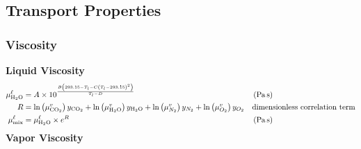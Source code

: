         \newpage
        \subsection{Transport Properties}
            \subsubsection{Viscosity} \cite{Morgan2015}
                \textbf{Liquid Viscosity}
                \begin{align}
                    \mu ^{\liq}_{\HtwoO} &= A \times 10^\frac{B\left(293.15 - T_l - C\left(T_l - 293.15\right)^2\right)}{T_l - D}
                    && \left(\unit{Pa\,s}\right)\\
                    R &= \ln\left(\mu^{\vap}_{\COtwo}\right) y_{\COtwo}+\ln\left(\mu^{\vap}_{\HtwoO}\right) y_{\HtwoO}+\ln\left(\mu^{\vap}_{N_2}\right) y_{N_2}+\ln\left(\mu^{\vap}_{O_2}\right) y_{O_2}
                    && \text{dimensionless correlation term}\\
                    \mu ^{\liq}_{\text{mix}} &= \mu ^{\liq}_{\HtwoO} \times e^{R}
                    && \left(\unit{Pa\,s}\right)
                \end{align}
                \vspace{.5cm}
                \textbf{Vapor Viscosity}
